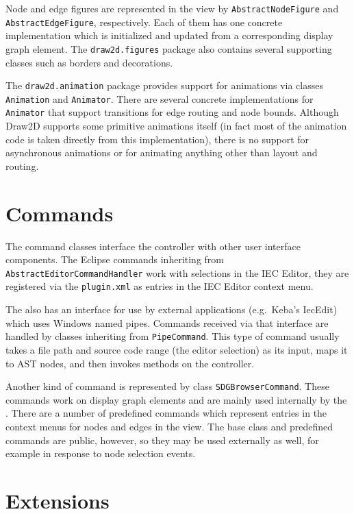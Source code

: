 Node and edge figures are represented in the view by \lstinline|AbstractNodeFigure| and \lstinline|AbstractEdgeFigure|, 
respectively. Each of them has one concrete implementation which is initialized and updated from a corresponding 
display graph element. The \lstinline|draw2d.figures| package also contains several supporting classes such as borders 
and decorations.

The \lstinline|draw2d.animation| package provides support for animations via classes \lstinline|Animation| and 
\lstinline|Animator|. There are several concrete implementations for \lstinline|Animator| that support transitions for 
edge routing and node bounds. Although Draw2D supports some primitive animations itself (in fact most of the animation 
code is taken directly from this implementation), there is no support for asynchronous animations or for animating 
anything other than layout and routing.


\section{Commands}

The command classes interface the \SB controller with other user interface components. The Eclipse commands inheriting 
from \lstinline|AbstractEditorCommandHandler| work with selections in the IEC Editor, they are registered via the \SB 
\lstinline|plugin.xml| as entries in the IEC Editor context menu.

The \SB also has an interface for use by external applications (e.g.\ Keba's IecEdit) which uses Windows named pipes. 
Commands received via that interface are handled by classes inheriting from \lstinline|PipeCommand|. This type of 
command usually takes a file path and source code range (the editor selection) as its input, maps it to AST nodes, and 
then invokes methods on the \SB controller.

Another kind of command is represented by class \lstinline|SDGBrowserCommand|. These commands work on display graph 
elements and are mainly used internally by the \SB. There are a number of predefined commands which represent entries 
in the context menus for nodes and edges in the \SB view. The base class and predefined commands are public, however, 
so they may be used externally as well, for example in response to node selection events.


\section{Extensions}

